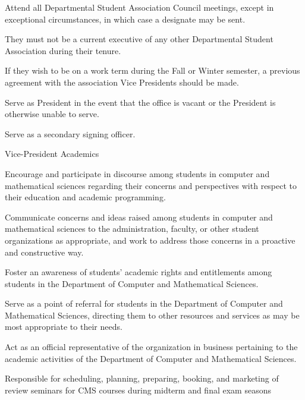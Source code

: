 \documentclass[12pt,a4paper]{article}
\begin{document}
\begin{constitutionlist}
\begin{constitutionlist}
\begin{constitutionlist}
\item Attend all Departmental Student Association Council meetings, except in exceptional circumstances, in which case a designate may be sent.

\item They must not be a current executive of any other Departmental Student Association during their tenure.

\item If they wish to be on a work term during the Fall or Winter semester, a previous agreement with the association Vice Presidents should be made.

\item Serve as President in the event that the office is vacant or the President is otherwise unable to serve.

\item Serve as a secondary signing officer.
\end{constitutionlist}

\item Vice-President Academics

\begin{constitutionlist}
\item Encourage and participate in discourse among students in computer and mathematical sciences regarding their concerns and perspectives with respect to their education and academic programming.

\item Communicate concerns and ideas raised among students in computer and mathematical sciences to the administration, faculty, or other student organizations as appropriate, and work to address those concerns in a proactive and constructive way.

\item Foster an awareness of students' academic rights and entitlements among students in the Department of Computer and Mathematical Sciences.

\item Serve as a point of referral for students in the Department of Computer and Mathematical Sciences, directing them to other resources and services as may be most appropriate to their needs.

\item Act as an official representative of the organization in business pertaining to the academic activities of the Department of Computer and Mathematical Sciences.

\item Responsible for scheduling, planning, preparing, booking, and marketing of review seminars for CMS courses during midterm and final exam seasons


\end{constitutionlist}
\end{constitutionlist}
\end{constitutionlist}
\end{document}
